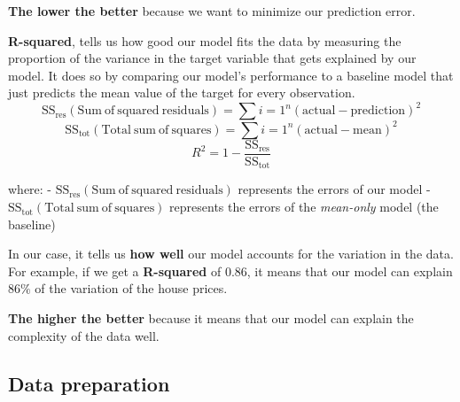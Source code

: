\documentclass[11pt]{article}
\begin{document}
\textbf{The lower the better} because we want to minimize our prediction
error.

\textbf{R-squared}, tells us how good our model fits the data by
measuring the proportion of the variance in the target variable that
gets explained by our model. It does so by comparing our model's
performance to a baseline model that just predicts the mean value of the
target for every observation.
\[\mathrm{SS}_{\mathrm{res}}(\mathrm{Sum\ of\ squared\ residuals})=\sum{i=1}^{n}(\mathrm{actual}-\mathrm{prediction})^2\]
\[\mathrm{SS}_{\mathrm{tot}}(\mathrm{Total\ sum\ of\ squares})=\sum{i=1}^{n}(\mathrm{actual}-\mathrm{mean})^2\]
\[R^2=1-\frac{\mathrm{SS}_{\mathrm{res}}}{\mathrm{SS}_{\mathrm{tot}}}\]

where: -
\(\mathrm{SS}_{\mathrm{res}}(\mathrm{Sum\ of\ squared\ residuals})\)
represents the errors of our model -
\(\mathrm{SS}_{\mathrm{tot}}(\mathrm{Total\ sum\ of\ squares})\)
represents the errors of the \emph{mean-only} model (the baseline)

In our case, it tells us \textbf{how well} our model accounts for the
variation in the data. For example, if we get a \textbf{R-squared} of
\(0.86\), it means that our model can explain \(86\%\) of the variation
of the house prices.

\textbf{The higher the better} because it means that our model can
explain the complexity of the data well.

    \subsection{Data preparation}\label{data-preparation}
\end{document}
